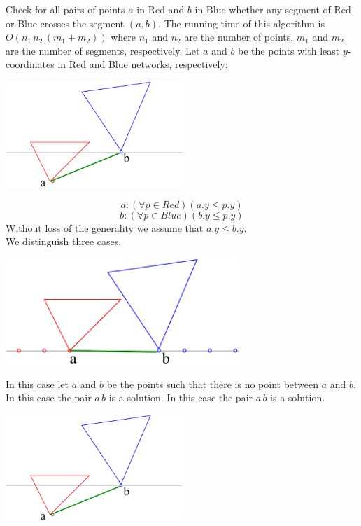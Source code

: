 Check for all pairs of points $a$ in Red and $b$ in Blue whether any segment of Red or Blue crosses the segment $\overline{(a,b)}$. The running time of this algorithm is $O(n_1 \, n_2 \, (m_1+m_2))$ where $n_1$ and $n_2$ are the number of points, $m_1$ and $m_2$ are the number of segments, respectively.
Let $a$ and $b$ be the points with least $y$-coordinates in Red and Blue networks, respectively:\\
\begin{center}
\includegraphics[height=4cm]{img/abra11.pdf}
\end{center}

$$a: ( \forall p \in Red)(a.y \leq p.y)$$
$$b: ( \forall p \in Blue)(b.y \leq p.y)$$
Without loss of the generality we assume that $a.y \leq b.y$.\\
We distinguish three cases.
\begin{center}
\includegraphics[height=4cm]{img/abra12.pdf}
\end{center}

In this case let $a$ and $b$ be the points such that there is no point between $a$ and $b$. In this case the pair $a \,b$  is a solution.
In this case the pair $a \, b$ is a solution.\\
\begin{center}
\includegraphics[height=4cm]{img/abra11.pdf}
\end{center}

